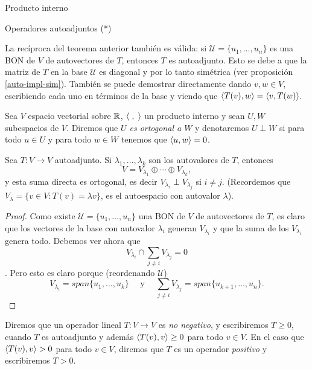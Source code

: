 \begin{chapter}{Producto interno}
\begin{section}{Operadores autoadjuntos (*)}
        
        \begin{observacion*} La recíproca del teorema anterior también es válida: si $\mathcal{U} = \{u_1,\ldots,u_n\}$ es una BON de $V$ de autovectores de $T$, entonces $T$ es autoadjunto. Esto se debe a que la matriz de $T$ en la base $\mathcal{U}$ es diagonal y por lo tanto simétrica (ver proposición \ref{auto-impl-sim}). También se puede demostrar directamente dando $v,w \in V$, escribiendo cada uno en términos de la base y viendo que 
            $\langle T(v),w\rangle = \langle v,T(w) \rangle$.
        \end{observacion*}

        \begin{definicion}  Sea $V$ espacio vectorial  sobre $\mathbb R$, $\langle\;,\;\rangle$ un producto interno y sean $U, W$ subespacios de $V$. Diremos que \textit{$U$ es ortogonal a $W$} y denotaremos $U \perp W$ si  para todo $u \in U$ y para todo $w \in W$ tenemos que $ \langle u,w\rangle =0$. 
        \end{definicion}
        
        \begin{proposicion}\label{desc-ort}
            Sea $T: V \to V$ autoadjunto.  Si $\lambda_1, \ldots,\lambda_k$ son los autovalores de $T$,  entonces 
            $$
            V = V_{\lambda_1}\oplus \cdots \oplus V_{\lambda_k},
            $$
            y  esta suma directa es ortogonal, es decir $V_{\lambda_i} \perp V_{\lambda_j}$  si $i \ne j$.
            (Recordemos que $V_\lambda = \{v \in V: T(v)= \lambda v \}$, es el autoespacio con autovalor $\lambda$). 
        \end{proposicion}
        \begin{proof}
            Como existe $\mathcal{U} = \{u_1,\ldots,u_n\}$ una BON de $V$ de autovectores de $T$, es claro que  los vectores de la base con autovalor $\lambda_i$ generan $V_{\lambda_i}$ y que la suma de los $V_{\lambda_i}$ genera todo. Debemos ver ahora que 
            $$V_{\lambda_i} \cap \sum_{j  \ne i} V_{\lambda_j} = 0 $$. 
            Pero esto es claro porque (reordenando $\mathcal{U}$) 
            $$V_{\lambda_i} = span\{u_1,\ldots,u_k\} \quad \text{ y } \quad \sum_{j  \ne i} V_{\lambda_j} = span\{u_{k+1},\ldots,u_n\}.$$     
        \end{proof}
        
        \begin{definicion}
            Diremos que un operador lineal $T: V \to V$ es \textit{no negativo}, y escribiremos $T \ge 0$, cuando $T$ es autoadjunto  y además $\langle T(v),v \rangle \ge 0$ para todo $v \in V$. En  el caso que $\langle T(v),v \rangle > 0$ para todo  $v \in V$, diremos que $T$ es un operador \textit{positivo} y escribiremos $T>0$.
        \end{definicion}
        

\end{section}
\end{chapter}
